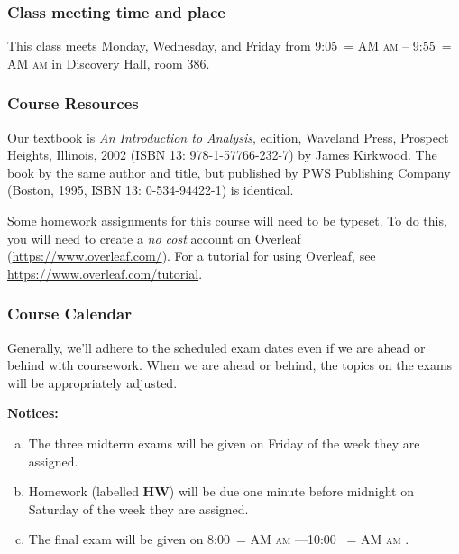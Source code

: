 \documentclass[12pt]{article}
\makeatletter
\newcounter{ex}\setcounter{ex}{0}
\newenvironment{alphalist}{
  \begin{enumerate}[(a)]
    \addtolength{\itemsep}{-0.5\itemsep}}
  {\end{enumerate}}
\DeclareRobustCommand{\maybefakesc}[1]{%
  \ifnum\pdfstrcmp{\f@series}{\bfdefault}=\z@
    {\fontsize{\dimexpr0.8\dimexpr\f@size pt\relax}{0}\selectfont\uppercase{#1}}%
  \else
    \textsc{#1}%
  \fi
}
\newcommand\AM{\,\maybefakesc{am}\xspace}
\newcommand{\room}{Discovery Hall, room  386}
\newcommand{\meetingtime}{This class meets Monday, Wednesday, and Friday  from 
	9:05\AM -- 9:55\AM}
\newcommand{\finaldateandtime}{\printdate{13/12/\the\year} 8:00\AM{}---10:00 \AM}
\makeatother
\begin{document}
\subsubsection*{Class meeting time and place}

\meetingtime in \room.

\subsubsection*{Course Resources}

Our textbook is \emph{An Introduction to Analysis},  edition, Waveland Press, Prospect Heights, Illinois, 2002 (ISBN 13: 978-1-57766-232-7) by James Kirkwood. The book by the same author and title, but published by PWS Publishing Company (Boston, 1995, ISBN 13:
0-534-94422-1) is identical.

 Some homework assignments for this course will need to be typeset. To do this, you will need to create a \emph{no cost} 
account on Overleaf (\url{https://www.overleaf.com/}).   For a  tutorial for using Overleaf, see \url{https://www.overleaf.com/tutorial}.



\subsubsection*{Course Calendar}

Generally, we'll adhere to the scheduled exam dates even if we are ahead or behind with coursework.  
When we are ahead or behind, the topics on the exams will be appropriately adjusted.  


\vspace{0.1in}
\noindent \textbf{Notices:}


\begin{alphalist}
   \item The three midterm exams will be given on Friday of the week they are assigned.
   
    \item Homework (labelled \textbf{HW}) will be due one minute before midnight on  Saturday of the week they are assigned.  

    \item The final exam will be given on \finaldateandtime.
    
\end{alphalist}

\vspace{0.1in}
\end{document}
